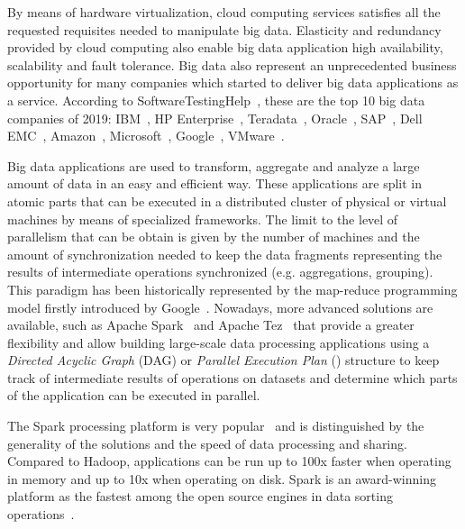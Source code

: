 By means of hardware virtualization, cloud computing services satisfies all the requested requisites needed to manipulate big data. Elasticity and redundancy provided by cloud computing also enable big data application high availability, scalability and fault tolerance.
Big data also represent an unprecedented business opportunity for many companies which started to deliver big data applications as a service. According to SoftwareTestingHelp~\cite{misc:BigDataCompanies}, these are the top 10 big data companies of 2019: IBM~\cite{misc:IBM}, HP Enterprise~\cite{misc:HPE}, Teradata~\cite{misc:Teradata}, Oracle~\cite{misc:Oracle}, SAP~\cite{misc:SAP}, Dell EMC~\cite{misc:EMC}, Amazon~\cite{misc:AWS}, Microsoft~\cite{misc:Microsoft}, Google~\cite{misc:Google}, VMware~\cite{misc:VMware}.

Big data applications are used to transform, aggregate and analyze a large amount of data in an easy and efficient way. These applications are split in atomic parts that can be executed in a distributed cluster of physical or virtual machines by means of specialized frameworks. The limit to the level of parallelism that can be obtain is given by the number of machines and the amount of synchronization needed to keep the data fragments representing the results of intermediate operations synchronized (e.g. aggregations, grouping). This paradigm has been historically represented by the map-reduce programming model firstly introduced by Google~\cite{misc:GoogleMapReduce}. Nowadays, more advanced solutions are available, such as Apache Spark~\cite{misc:ApacheSpark} and Apache Tez~\cite{misc:ApacheTez} that provide a greater flexibility and allow building large-scale data processing applications using a \textit{Directed Acyclic Graph} (DAG) or \textit{Parallel Execution Plan} (\plan) structure to keep track of intermediate results of operations on datasets and determine which parts of the application can be executed in parallel.


The Spark processing platform is very popular~\cite{articleApacheSpark:2015} and is distinguished by the generality of the solutions and the speed of data processing and sharing. Compared to Hadoop, applications can be run up to 100x faster when operating in memory and up to 10x when operating on disk. Spark is an award-winning platform as the fastest among the open source engines in data sorting operations~\cite{articleApacheSpark:2016}.

